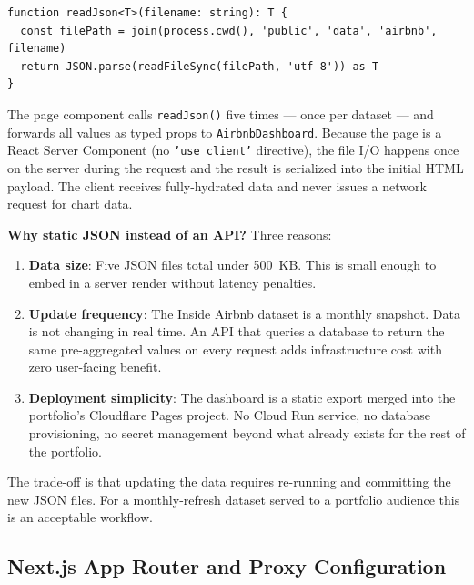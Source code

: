 \begin{lstlisting}[style=typescript, caption={Static JSON loading in \filepath{src/app/airbnb/page.tsx} (lines 11--14)}]
function readJson<T>(filename: string): T {
  const filePath = join(process.cwd(), 'public', 'data', 'airbnb', filename)
  return JSON.parse(readFileSync(filePath, 'utf-8')) as T
}
\end{lstlisting}

The page component calls \texttt{readJson()} five times — once per dataset — and
forwards all values as typed props to \texttt{AirbnbDashboard}. Because the page
is a React Server Component (no \texttt{'use client'} directive), the file I/O
happens once on the server during the request and the result is serialized into
the initial HTML payload. The client receives fully-hydrated data and never issues
a network request for chart data.

\begin{decisionbox}
  \textbf{Why static JSON instead of an API?} Three reasons:

  \begin{enumerate}
    \item \textbf{Data size}: Five JSON files total under 500~KB. This is small
          enough to embed in a server render without latency penalties.
    \item \textbf{Update frequency}: The Inside Airbnb dataset is a monthly snapshot.
          Data is not changing in real time. An API that queries a database to return
          the same pre-aggregated values on every request adds infrastructure cost
          with zero user-facing benefit.
    \item \textbf{Deployment simplicity}: The dashboard is a static export merged
          into the portfolio's Cloudflare Pages project. No Cloud Run service, no
          database provisioning, no secret management beyond what already exists
          for the rest of the portfolio.
  \end{enumerate}

  The trade-off is that updating the data requires re-running 
  and committing the new JSON files. For a monthly-refresh dataset served to a
  portfolio audience this is an acceptable workflow.
\end{decisionbox}

\subsection{Next.js App Router and Proxy Configuration}

